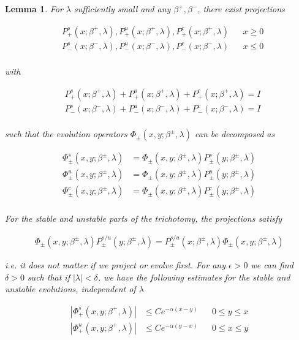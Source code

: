 \documentclass[12pt]{article}
\newtheorem{lemma}{Lemma}
\begin{document}
\begin{lemma}\label{trichotomy}
For $\lambda$ sufficiently small and any $\beta^+, \beta^-$, there exist projections

\begin{align*}
&P_+^s(x; \beta^+, \lambda), P_+^u(x; \beta^+, \lambda), P_+^c(x; \beta^+, \lambda) && x \geq 0 \\
&P_-^s(x; \beta^-, \lambda), P_-^u(x; \beta^-, \lambda), P_-^c(x; \beta^-, \lambda) && x \leq 0 \\
\end{align*}

with

\begin{align*}
&P_+^s(x; \beta^+, \lambda) + P_+^u(x; \beta^+, \lambda) + P_+^c(x; \beta^+, \lambda) = I \\
&P_-^s(x; \beta^-, \lambda) + P_-^u(x; \beta^-, \lambda) + P_-^c(x; \beta^-, \lambda) = I \\
\end{align*}

such that the evolution operators $\Phi_\pm(x, y; \beta^\pm, \lambda)$ can be decomposed as

\begin{align*}
\Phi^s_\pm(x, y; \beta^\pm, \lambda) &= \Phi_\pm(x, y; \beta^\pm, \lambda) P^s_\pm(y; \beta^\pm, \lambda) \\
\Phi^u_\pm(x, y; \beta^\pm, \lambda) &= \Phi_\pm(x, y; \beta^\pm, \lambda) P^u_\pm(y; \beta^\pm, \lambda) \\
\Phi^c_\pm(x, y; \beta^\pm, \lambda) &= \Phi_\pm(x, y; \beta^\pm, \lambda) P^c_\pm(y; \beta^\pm, \lambda) \\
\end{align*}

For the stable and unstable parts of the trichotomy, the projections satisfy 

\begin{align*}
\Phi_\pm(x, y; \beta^\pm, \lambda) P^{s/u}_\pm(y; \beta^\pm, \lambda) 
= P^{s/u}_\pm(x; \beta^\pm, \lambda) \Phi_\pm(x, y; \beta^\pm, \lambda)
\end{align*}

i.e. it does not matter if we project or evolve first. For any $\epsilon > 0$ we can find $\delta > 0$ such that if $|\lambda| < \delta$, we have the following estimates for the stable and unstable evolutions, independent of $\lambda$

\begin{align*}
|\Phi^s_+(x, y; \beta^+, \lambda)| &\leq C e^{-\alpha(x - y)} && 0 \leq y \leq x \\
|\Phi^u_+(x, y; \beta^+, \lambda)| &\leq C e^{-\alpha(y - x)} && 0 \leq x \leq y \\
\end{align*}


\end{lemma}
\end{document}

